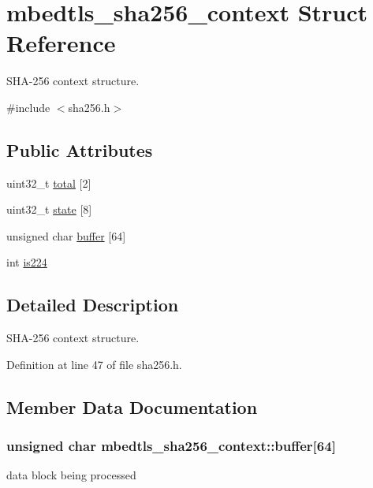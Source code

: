 \hypertarget{structmbedtls__sha256__context}{\section{mbedtls\-\_\-sha256\-\_\-context Struct Reference}
\label{structmbedtls__sha256__context}
}


S\-H\-A-\/256 context structure.  




{\ttfamily \#include $<$sha256.\-h$>$}

\subsection*{Public Attributes}
\begin{DoxyCompactItemize}
\item 
uint32\-\_\-t \hyperlink{structmbedtls__sha256__context_ab7444610a95153450180924862b2a0fa}{total} \mbox{[}2\mbox{]}
\item 
uint32\-\_\-t \hyperlink{structmbedtls__sha256__context_a88df25a0934134bd8b686152ba763322}{state} \mbox{[}8\mbox{]}
\item 
unsigned char \hyperlink{structmbedtls__sha256__context_adb4c87a904e9d4099592c5bf7ff0b308}{buffer} \mbox{[}64\mbox{]}
\item 
int \hyperlink{structmbedtls__sha256__context_ac73158ffb252c4bd2ccb991653619cc1}{is224}
\end{DoxyCompactItemize}


\subsection{Detailed Description}
S\-H\-A-\/256 context structure. 

Definition at line 47 of file sha256.\-h.



\subsection{Member Data Documentation}
\hypertarget{structmbedtls__sha256__context_adb4c87a904e9d4099592c5bf7ff0b308}{
\subsubsection[{buffer}]{\setlength{\rightskip}{0pt plus 5cm}unsigned char mbedtls\-\_\-sha256\-\_\-context\-::buffer\mbox{[}64\mbox{]}}}\label{structmbedtls__sha256__context_adb4c87a904e9d4099592c5bf7ff0b308}
data block being processed 

